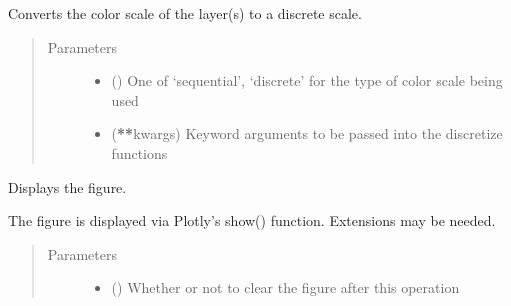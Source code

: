\documentclass[letterpaper,10pt,english]{sphinxmanual}
\begin{document}
\begin{fulllineitems}
\begin{fulllineitems}
\label{\detokenize{builder:geohexviz.builder.PlotBuilder.discretize_scale}}
\sphinxAtStartPar
Converts the color scale of the layer(s) to a discrete scale.
\begin{quote}\begin{description}
\item[{Parameters}] \leavevmode\begin{itemize}
\item {} 
\sphinxAtStartPar
{} () \textendash{} One of ‘sequential’, ‘discrete’ for the type of color scale being used

\item {} 
\sphinxAtStartPar
{} ({\color{red}\bfseries{}**}kwargs) \textendash{} Keyword arguments to be passed into the discretize functions

\end{itemize}

\end{description}\end{quote}

\end{fulllineitems}


\begin{fulllineitems}
\label{\detokenize{builder:geohexviz.builder.PlotBuilder.display}}
\sphinxAtStartPar
Displays the figure.

\sphinxAtStartPar
The figure is displayed via Plotly’s show() function.
Extensions may be needed.
\begin{quote}\begin{description}
\item[{Parameters}] \leavevmode\begin{itemize}
\item {} 
\sphinxAtStartPar
{} () \textendash{} Whether or not to clear the figure after this operation


\end{itemize}
\end{description}
\end{quote}
\end{fulllineitems}
\end{fulllineitems}
\end{document}

